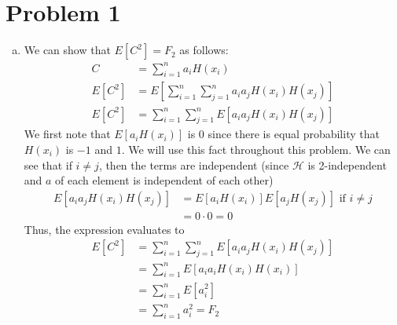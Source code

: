 \documentclass{article}
\theoremstyle{casestyle}
\begin{document}
\section *{Problem 1}
\begin{enumerate}[a)]
\item We can show that $E[C^2]=F_2$ as follows: 
\begin{align*}
  C &= \sum_{i=1}^na_iH(x_i) \\
  E[C^2] &= E\left[\sum_{i=1}^n\sum_{j=1}^na_ia_jH(x_i)H(x_j)\right]\\
  E[C^2] &= \sum_{i=1}^n\sum_{j=1}^nE\left[a_ia_jH(x_i)H(x_j)\right]
\end{align*} 
We first note that $E[a_iH(x_i)]$ is $0$ since there is equal probability that $H(x_i)$ is $-1$ and $1$. We will use this fact throughout this problem. We can see that if $i \neq j$, then the terms are independent (since $\mathscr{H}$ is 2-independent and $a$ of each element is independent of each other)
\begin{align*}
  E\left[a_ia_jH(x_i)H(x_j)\right] &= E[a_iH(x_i)]E[a_jH(x_j)]\text{ if }i\neq j \\
&= 0 \cdot 0 = 0
\end{align*}
Thus, the expression evaluates to
\begin{align*}
  E[C^2] &= \sum_{i=1}^n\sum_{j=1}^nE\left[a_ia_jH(x_i)H(x_j)\right] \\
         &= \sum_{i=1}^nE\left[a_ia_iH(x_i)H(x_i)\right]\\
         &= \sum_{i=1}^nE\left[a_i^2\right] \\
         &= \sum_{i=1}^na_i^2 = F_2
\end{align*} 


\end{enumerate}
\end{document}
